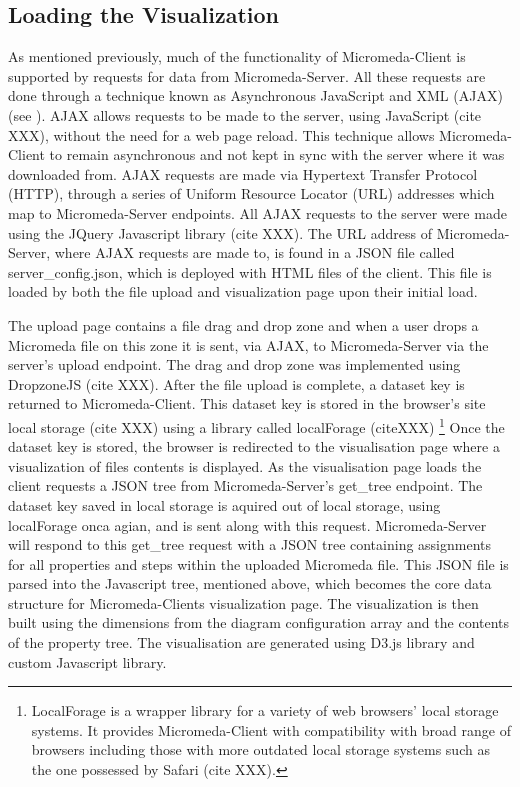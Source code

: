 \subsection{Loading the Visualization}

As mentioned previously, much of the functionality of Micromeda-Client is supported by requests for data from Micromeda-Server. All these requests are done through a technique known as Asynchronous JavaScript and XML (AJAX) \cite{XXX} (see \href{}{}). AJAX allows requests to be made to the server, using JavaScript (cite XXX), without the need for a web page reload. This technique allows Micromeda-Client to remain asynchronous and not kept in sync with the server where it was downloaded from. AJAX requests are made via Hypertext Transfer Protocol (HTTP), through a series of Uniform Resource Locator (URL) addresses which map to Micromeda-Server endpoints. All AJAX requests to the server were made using the JQuery Javascript library (cite XXX). The URL address of Micromeda-Server, where AJAX requests are made to, is found in a JSON file called server\_config.json, which is deployed with HTML files of the client. This file is loaded by both the file upload and visualization page upon their initial load. 

The upload page contains a file drag and drop zone and when a user drops a Micromeda file on this zone it is sent, via AJAX, to Micromeda-Server via the server's upload endpoint. The drag and drop zone was implemented using DropzoneJS (cite XXX). After the file upload is complete, a dataset key is returned to Micromeda-Client. This dataset key is stored in the browser's site local storage (cite XXX) using a library called localForage (citeXXX) \footnote{LocalForage is a wrapper library for a variety of web browsers' local storage systems. It provides Micromeda-Client with compatibility with broad range of browsers including those with more outdated local storage systems such as the one possessed by Safari (cite XXX).} Once the dataset key is stored, the browser is redirected to the visualisation page where a visualization of files contents is displayed. As the visualisation page loads the client requests a JSON tree from Micromeda-Server's get\_tree endpoint. The dataset key saved in local storage is aquired out of local storage, using localForage onca agian, and is sent along with this request. Micromeda-Server will respond to this get\_tree request with a JSON tree containing assignments for all properties and steps within the uploaded Micromeda file. This JSON file is parsed into the Javascript tree, mentioned above, which becomes the core data structure for Micromeda-Clients visualization page. The visualization is then built using the dimensions from the diagram configuration array and the contents of the property tree. The visualisation are generated using D3.js library and custom Javascript library.

